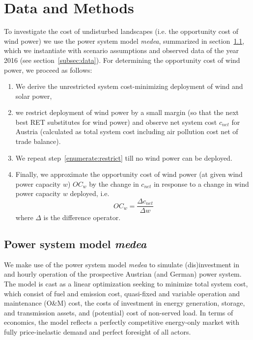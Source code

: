 \documentclass[review, 3p, times]{elsarticle} %
\begin{document}


    \section{Data and Methods} \label{sec:data-and-methods}
    To investigate the cost of undisturbed landscapes (i.e. the opportunity cost of wind power) we use the power system
    model \emph{medea}, summarized in section~\ref{subsec:medea}, which we instantiate with scenario assumptions
    and observed data of the year 2016 (see section~\ref{subsec:data}).
    For determining the opportunity cost of wind power, we proceed as follows:
    \begin{enumerate}
        \item We derive the unrestricted system cost-minimizing deployment of wind and solar power,
        \item we restrict deployment of wind power by a small margin (so that the next best RET substitutes for wind power)
        and observe net system cost $c_{net}$ for Austria (calculated as total system cost including air pollution cost
        net of trade balance).\label{enumerate:restrict}
        \item We repeat step~\ref{enumerate:restrict} till no wind power can be deployed.
        \item Finally, we approximate the opportunity cost of wind power (at given wind power capacity $w$) $OC_w$ by
        the change in $c_{net}$ in response to a change in wind power capacity $w$ deployed, i.e.\
        \[OC_w = \frac{\Delta c_{net}}{\Delta w}\]
        where $\Delta$ is the difference operator.
    \end{enumerate}

    \subsection{Power system model \emph{medea}} \label{subsec:medea}
    We make use of the power system model \emph{medea} to simulate (dis)investment in and hourly operation of the
    prospective Austrian (and German) power system.
    The model is cast as a linear optimization seeking to minimize total system cost, which consist of fuel and emission
    cost, quasi-fixed and variable operation and maintenance (O\&M) cost, the costs of investment in energy generation,
    storage, and transmission assets, and (potential) cost of non-served load.
    In terms of economics, the model reflects a perfectly competitive energy-only market with fully price-inelastic
    demand and perfect foresight of all actors.
\end{document}
